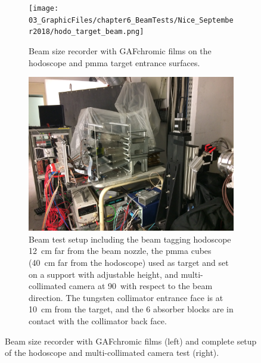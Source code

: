 \begin{figure}[!htbp]
\begin{subfigure}[t]{.5\textwidth}
\centering
\texttt{[image: 03\_GraphicFiles/chapter6\_BeamTests/Nice\_September2018/hodo\_target\_beam.png]}
\caption{Beam size recorder with GAFchromic films on the hodoscope and \gls{pmma} target entrance surfaces.}
\label{chap6::fig::September_beamSize}
\end{subfigure}
\begin{subfigure}[t]{.5\textwidth}
\centering
\includegraphics[width=1.\textwidth]{03_GraphicFiles/chapter6_BeamTests/Nice_September2018/Setup_withColl_withHodo.jpg}	
\caption{Beam test setup including the beam tagging hodoscope 12~cm far from the beam nozzle, the \gls{pmma} cubes (40~cm far from the hodoscope) used as target and set on a support with adjustable height, and multi-collimated camera at 90\textdegree ~with respect to the beam direction. The tungsten collimator entrance face is at 10~cm from the target, and the 6 absorber blocks are in contact with the collimator back face.}
\label{chap6::fig::September_SetupPicture}
\end{subfigure}
\caption{Beam size recorder with GAFchromic films (left) and complete setup of the hodoscope and multi-collimated camera test (right).}
\label{chap6::fig::September_SetupCamera}
\end{figure}

